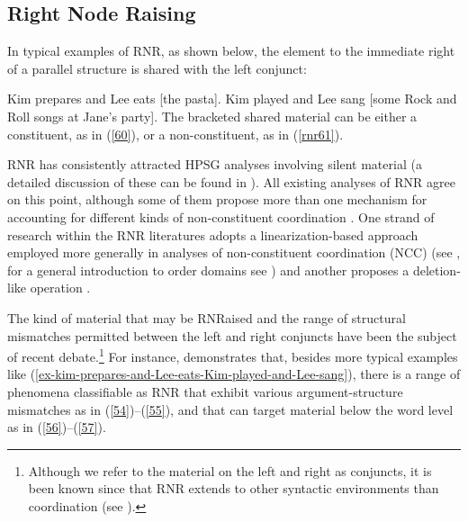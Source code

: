 \subsection{Right Node Raising}
\label{ellipsis:sec-rnr}

In typical examples of RNR, as shown below, the element to the immediate right of a parallel structure is shared with the left conjunct:

\eal
\label{ex-kim-prepares-and-Lee-eats-Kim-played-and-Lee-sang}
\ex  Kim prepares and Lee eats [the pasta].  \label{60}
\ex  Kim played and Lee sang [some Rock and Roll songs at Jane's party]. \label{rnr61}
\zl
%
The bracketed shared material can be either a constituent, as in (\ref{60}), or a non-constituent, as in (\ref{rnr61}).

RNR has consistently attracted HPSG analyses involving silent material (a detailed discussion of these can be found
in ). 
All existing analyses of RNR \citep{Abeille2016, Beavers2004, Chaves2014, Crysmann2003, Shiraishi2019, Yatabe2001, Yatabe2012} agree on this point,
although some of them propose more than one mechanism for accounting for different kinds of non-constituent coordination \citep{Chaves2014, Yatabe2001, Yatabe2012, Yatabe2019}. One strand of research within the RNR literatures adopts a linearization-based approach employed more generally in analyses of non-constituent coordination (NCC) (see \citealt{Yatabe2001, Yatabe2012}, for a general introduction to order domains see ) and another proposes a deletion-like operation \citep{Abeille2016, Chaves2014, Shiraishi2019}.

%

The kind of material that may be RNRaised and the range of structural mismatches permitted between the left and right conjuncts have been the subject of recent debate.\footnote{Although we refer to the material on the left and right as conjuncts, it is been known since \citet{Hudson1976, Hudson1989} that RNR extends to other syntactic environments than coordination (see \citealt{Chaves2014}).} For instance, \citet[839--840]{Chaves2014} demonstrates that, besides more typical examples like (\ref{ex-kim-prepares-and-Lee-eats-Kim-played-and-Lee-sang}),
 there is a range of phenomena classifiable as RNR that exhibit various argument-structure mismatches as in (\ref{54})--(\ref{55}), and that can target material below the word level as in (\ref{56})--(\ref{57}).
%

